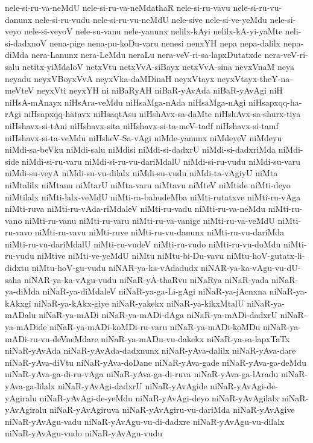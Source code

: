 {nele-si-ru-va-neMdU
nele-si-ru-va-neMdathaR
nele-si-ru-vavu
nele-si-ru-vu-danunx
nele-si-ru-vudu
nele-si-ru-vu-neMdU
nele-sive
nele-si-ve-yeMdu
nele-si-veyo
nele-si-veyoV
nele-su-vanu
nele-yanunx
nelilx-kAyi
nelilx-kA-yi-yaMte
neli-si-dadxnoV
nena-pige
nena-pu-koDu-varu
nenesi
nenxYH
nepa
nepa-dalilx
nepa-diMda
nera-Lanunx
nera-LeMdu
neraLu
nera-veV-ri-sa-lapxDutatxde
nera-veV-ri-salu
netitx-yiMdaloV
netxVtu
netxVvA-siBayx
netxVvA-sina
nevxVnaM
neya
neyadu
neyxVBoyxVvA
neyxVka-daMDinaH
neyxVtayx
neyxVtayx-theY-na-meVteV
neyxVti
neyxYH
ni
niBaRyAH
niBaR-yAvAda
niBaR-yAvAgi
niH
niHsA-mAnayx
niHsAra-veMdu
niHsaMga-nAda
niHsaMga-nAgi
niHsapxqq-ha-rAgi
niHsapxqq-hatavx
niHsaqtAsu
niHshAvx-sa-daMte
niHshAvx-sa-shurx-tiya
niHshavx-si-tAni
niHshavx-sita
niHshavx-si-ta-meV-tadf
niHshavx-si-tamf
niHshavx-si-ta-veMdu
niHsheV-Sa-vAgi
niMde-yanunx
niMdeyeV
niMdeyu
niMdi-sa-beVku
niMdi-salu
niMdisi
niMdi-si-dadxrU
niMdi-si-dadxriMda
niMdi-side
niMdi-si-ru-varu
niMdi-si-ru-vu-dariMdalU
niMdi-si-ru-vudu
niMdi-su-varu
niMdi-su-veyA
niMdi-su-vu-dilalx
niMdi-su-vudu
niMdi-ta-vAgiyU
niMta
niMtalilx
niMtanu
niMtarU
niMta-varu
niMtavu
niMteV
niMtide
niMti-deyo
niMtilalx
niMti-lalx-veMdU
niMti-ra-bahudeMba
niMti-rutatxve
niMti-ru-vAga
niMti-ruva
niMti-ru-vAda-riMdaleV
niMti-ru-vadu
niMti-ru-va-neMdu
niMti-ru-vano
niMti-ru-vanu
niMti-ru-varu
niMti-ru-va-vanige
niMti-ru-va-veMdU
niMti-ru-vavo
niMti-ru-vavu
niMti-ruve
niMti-ru-vu-danunx
niMti-ru-vu-dariMda
niMti-ru-vu-dariMdalU
niMti-ru-vudeV
niMti-ru-vudo
niMti-ru-vu-doMdu
niMti-ru-vudu
niMtive
niMti-ve-yeMdU
niMtu
niMtu-bi-Du-vavu
niMtu-hoV-gutatx-li-didxtu
niMtu-hoV-gu-vudu
niNAR-ya-ka-vAdadudx
niNAR-ya-ka-vAgu-vu-dU-saha
niNAR-ya-ka-vAgu-vudu
niNaR-yA-thaRvu
niNaRya
niNaR-yada
niNaR-ya-diMda
niNaR-ya-diMdaleV
niNaR-ya-ga-Li-gAgi
niNaR-ya-jAcnxna
niNaR-ya-kAkxgi
niNaR-ya-kAkx-giye
niNaR-yakekx
niNaR-ya-kikxMtalU
niNaR-ya-mADalu
niNaR-ya-mADi
niNaR-ya-mADi-dAga
niNaR-ya-mADi-dadxrU
niNaR-ya-mADide
niNaR-ya-mADi-koMDi-ru-varu
niNaR-ya-mADi-koMDu
niNaR-ya-mADi-ru-vu-deVneMdare
niNaR-ya-mADu-vu-dakekx
niNaR-ya-sa-lapxTaTx
niNaR-yAvAda
niNaR-yAvAda-dadxnunx
niNaR-yAva-dalilx
niNaR-yAva-dare
niNaR-yAva-diVtu
niNaR-yAva-doDane
niNaR-yAva-gade
niNaR-yAva-ga-deMdu
niNaR-yAva-ga-di-ru-vAga
niNaR-yAva-ga-di-ruva
niNaR-yAva-ga-lAradu
niNaR-yAva-ga-lilalx
niNaR-yAvAgi-dadxrU
niNaR-yAvAgide
niNaR-yAvAgi-de-yAgiralu
niNaR-yAvAgi-de-yeMdu
niNaR-yAvAgi-deyo
niNaR-yAvAgilalx
niNaR-yAvAgiralu
niNaR-yAvAgiruva
niNaR-yAvAgiru-vu-dariMda
niNaR-yAvAgive
niNaR-yAvAgu-vadu
niNaR-yAvAgu-vu-di-dadxre
niNaR-yAvAgu-vu-dilalx
niNaR-yAvAgu-vudo
niNaR-yAvAgu-vudu
}
